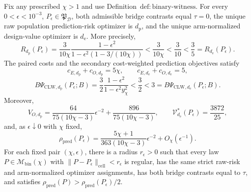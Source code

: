 Fix any prescribed \(\chi>1\) and use Definition~\(\mathrm{def{:}binary\text{-}witness}\). For every \(0<\epsilon<10^{-3}\), \(P_\epsilon\in\mathfrak P_{\mathcal D}\), both admissible bridge contrasts equal \(\tau=0\), the unique raw population prediction-risk optimizer is \(d_{\mathrm p}\), and the unique arm-normalized design-value optimizer is \(d_{\mathrm e}\). More precisely,
\[
 R_{d_{\mathrm p}}(P_\epsilon)
 =\frac{3}{10\chi}\frac{1-\epsilon^2}{1-\epsilon^2(1-3/(10\chi))}
 <\frac{3}{10\chi}<\frac3{10}<\frac35
 =R_{d_{\mathrm e}}(P_\epsilon).
\]
The paired costs and the secondary cost-weighted prediction objectives satisfy
\[
 c_{E,d_{\mathrm p}}+c_{O,d_{\mathrm p}}=5\chi,
 \qquad
 c_{E,d_{\mathrm e}}+c_{O,d_{\mathrm e}}=5,
\]
\[
 B\Psi_{\mathrm{CLW},d_{\mathrm p}}(P_\epsilon;B)
 =\frac32\frac{1-\epsilon^2}{1-\epsilon^2y_\chi^2}
 <\frac32<3
 =B\Psi_{\mathrm{CLW},d_{\mathrm e}}(P_\epsilon;B).
\]
Moreover,
\[
 V_{O,d_{\mathrm p}}
 =\frac{64}{75(10\chi-3)}\epsilon^{-2}
 +\frac{896}{75(10\chi-3)},
 \qquad
 \mathcal V_{d_{\mathrm e}}^*(P_\epsilon)=\frac{3872}{25},
\]
and, as \(\epsilon\downarrow0\) with \(\chi\) fixed,
\[
 \rho_{\mathrm{pred}}(P_\epsilon)
 =\frac{5\chi+1}{363(10\chi-3)}\epsilon^{-2}
 +O_\chi(\epsilon^{-1}).
\]
For each fixed pair \((\chi,\epsilon)\), there is a radius \(r_\epsilon>0\) such that every law \(P\in\mathcal M_{\mathrm{bin}}(\chi)\) with \(\|P-P_\epsilon\|_{\mathrm{cell}}<r_\epsilon\) is regular, has the same strict raw-risk and arm-normalized optimizer assignments, has both bridge contrasts equal to \(\tau\), and satisfies \(\rho_{\mathrm{pred}}(P)>\rho_{\mathrm{pred}}(P_\epsilon)/2\).